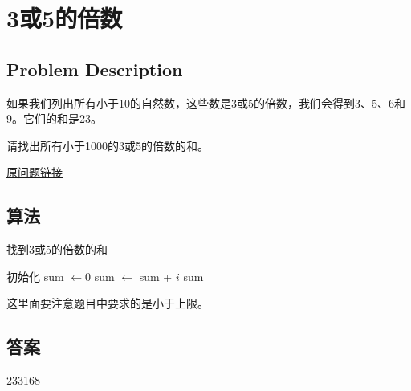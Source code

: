 \section{3或5的倍数}\label{sec:problem01}
\subsection{Problem Description}
\begin{tcolorbox}
	如果我们列出所有小于10的自然数，这些数是3或5的倍数，我们会得到3、5、6和9。它们的和是23。

	请找出所有小于1000的3或5的倍数的和。

	\href{https://projecteuler.net/problem=1}{原问题链接}
\end{tcolorbox}

\subsection{算法}
\begin{algorithm}
	\caption{找到3或5的倍数的和}
	\begin{algorithmic}
		\State 初始化 sum $\gets 0$
		\State sum $\gets$ sum + $i$
		\EndIf
		\EndFor
		\Return sum
	\end{algorithmic}
\end{algorithm}
这里面要注意题目中要求的是小于上限。

\subsection{答案}
233168
